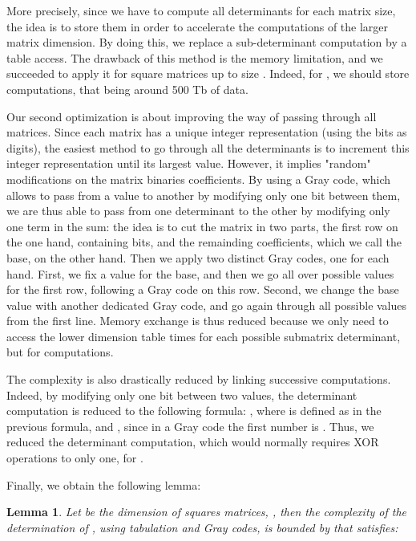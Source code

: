 \documentclass{article}\usepackage{amsthm}
\newtheorem{mylem}{Lemma}
\begin{document}
		
More precisely, since we have to compute all determinants for each matrix size, the idea is to store them in order to accelerate the computations of the larger matrix dimension. 
By doing this, we replace a sub-determinant computation by a table access. The drawback of this method is the memory limitation, and we succeeded to apply it for square matrices up to size . Indeed, for , we should store  computations, that being around 500 Tb of data. 





Our second optimization is about improving the way of passing through all
matrices. Since each matrix has a unique integer representation (using the 
bits as digits), the easiest method to go through all the determinants is to
increment this integer representation until its largest value. However, it implies "random" modifications on the matrix binaries coefficients. By using a Gray code, which allows to pass from a value to another by modifying only one bit between them, we are thus able to pass from one determinant to the other by modifying only one term in the sum:
the idea is to cut the matrix in two parts, the first row on the one hand, containing  bits, and the remainding  coefficients, which we call the base, on the other hand.
Then we apply two distinct Gray codes, one for each hand. 
First, we fix a value for the base, and then we go all over possible values for the first row, following a Gray code on this row. 
Second, we change the base value with another dedicated Gray code, and go again through all possible values from the first line. 
Memory exchange is thus reduced because we only need to access the lower dimension table  times for each possible submatrix determinant, but for  computations. 

The complexity is also drastically reduced by linking successive computations. Indeed, by modifying only one bit between two values, the determinant computation is reduced to the following formula: 
, where  is defined as in the previous formula, and , since in a Gray code the first number is . 
Thus, we reduced the determinant computation, which would normally requires  XOR operations to only one, for . 

Finally, we obtain the following lemma: 
\begin{mylem}
Let  be the dimension of squares matrices, , then the complexity of the determination of , using tabulation and Gray codes, is bounded by  that satisfies:

\end{mylem}
\end{document}
